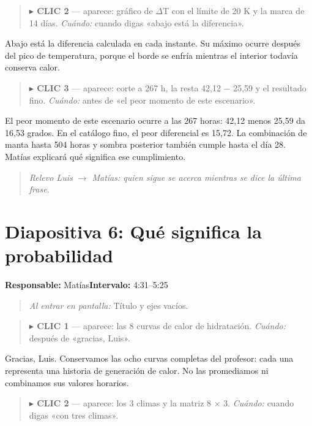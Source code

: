 \documentclass[11pt,a4paper]{article}
\newenvironment{indicacion}{\begin{quote}\small\color{grisindicacion}}{\end{quote}}
\newcommand{\lamina}[4]{%
  \section*{\color{petroleo}Diapositiva #1: #2}%
  \textbf{Responsable:} #3\hfill\textbf{Intervalo:} #4\par
}
\begin{document}
\begin{indicacion}\textbf{\ensuremath{\blacktriangleright} CLIC 2} --- aparece: gráfico de \ensuremath{\Delta}T con el límite de 20 K y la marca de 14 días. \emph{Cuándo:} cuando digas «abajo está la diferencia».\end{indicacion}


Abajo está la diferencia calculada en cada instante. Su máximo ocurre después del pico de temperatura, porque el borde se enfría mientras el interior todavía conserva calor.



\begin{indicacion}\textbf{\ensuremath{\blacktriangleright} CLIC 3} --- aparece: corte a 267 h, la resta 42,12 \ensuremath{-} 25,59 y el resultado fino. \emph{Cuándo:} antes de «el peor momento de este escenario».\end{indicacion}


El peor momento de este escenario ocurre a las 267 horas: 42,12 menos 25,59 da 16,53 grados. En el catálogo fino, el peor diferencial es 15,72. La combinación de manta hasta 504 horas y sombra posterior también cumple hasta el día 28. Matías explicará qué significa ese cumplimiento.



\begin{indicacion}\emph{Relevo Luis \ensuremath{\rightarrow} Matías: quien sigue se acerca mientras se dice la última frase.}\end{indicacion}

\clearpage

\lamina{6}{Qué significa la probabilidad}{Matías}{4:31--5:25}

\begin{indicacion}\emph{Al entrar en pantalla:} Título y ejes vacíos.\end{indicacion}

\begin{indicacion}\textbf{\ensuremath{\blacktriangleright} CLIC 1} --- aparece: las 8 curvas de calor de hidratación. \emph{Cuándo:} después de «gracias, Luis».\end{indicacion}


Gracias, Luis. Conservamos las ocho curvas completas del profesor: cada una representa una historia de generación de calor. No las promediamos ni combinamos sus valores horarios.



\begin{indicacion}\textbf{\ensuremath{\blacktriangleright} CLIC 2} --- aparece: los 3 climas y la matriz 8 \ensuremath{\times} 3. \emph{Cuándo:} cuando digas «con tres climas».\end{indicacion}
\end{document}
